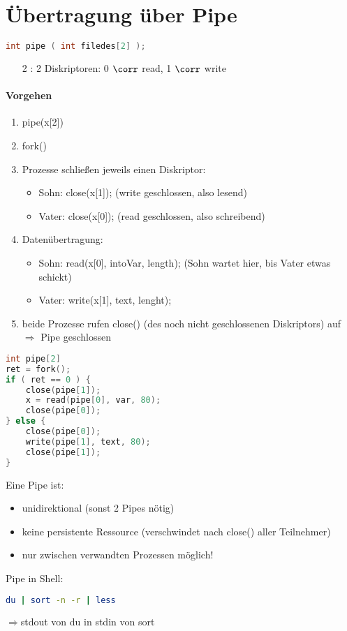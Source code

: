 \documentclass{scrreprt}
\begin{document}
\section{Übertragung über Pipe}
\begin{lstlisting}[language=C]
int pipe ( int filedes[2] );
\end{lstlisting}
\begin{itemize}
\item [2]: 2 Diskriptoren: 0 $\corr$ read, 1 $\corr$ write
\end{itemize}
\paragraph{Vorgehen}
\begin{enumerate}
\item pipe(x[2])
\item fork()
\item Prozesse schließen jeweils einen Diskriptor:
\begin{itemize}
\item Sohn: close(x[1]); (write geschlossen, also lesend)
\item Vater: close(x[0]); (read geschlossen, also schreibend)
\end{itemize}
\item Datenübertragung:
\begin{itemize}
\item Sohn: read(x[0], intoVar, length); (Sohn wartet hier, bis Vater etwas schickt)
\item Vater: write(x[1], text, lenght);
\end{itemize}
\item beide Prozesse rufen close() (des noch nicht geschlossenen Diskriptors) auf $\Rightarrow$ Pipe geschlossen
\end{enumerate}
\begin{lstlisting}[language=C]
int pipe[2]
ret = fork();
if ( ret == 0 ) {
	close(pipe[1]);
	x = read(pipe[0], var, 80);
	close(pipe[0]);
} else {
	close(pipe[0]);
	write(pipe[1], text, 80);
	close(pipe[1]);
}
\end{lstlisting}
Eine Pipe ist:
\begin{itemize}
\item unidirektional (sonst 2 Pipes nötig)
\item keine persistente Ressource (verschwindet nach close() aller Teilnehmer)
\item nur zwischen verwandten Prozessen möglich!
\end{itemize}
Pipe in Shell:
\begin{lstlisting}[language=bash]
du | sort -n -r | less
\end{lstlisting}
$\Rightarrow$stdout von du in stdin von sort
\end{document}
